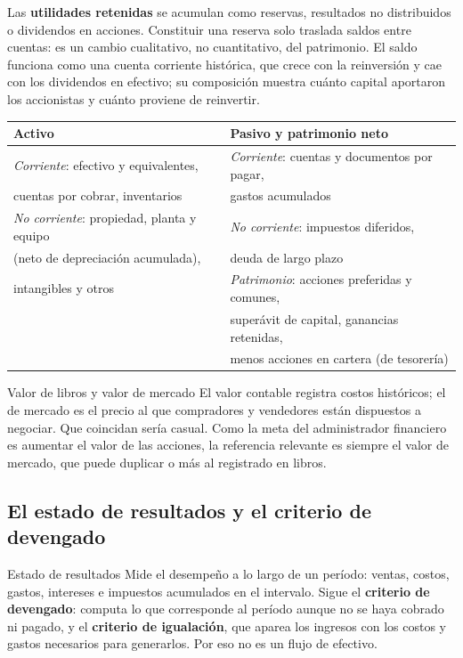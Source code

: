 Las \textbf{utilidades retenidas} se acumulan como reservas, resultados no distribuidos o dividendos en acciones. Constituir una reserva solo traslada saldos entre cuentas: es un cambio cualitativo, no cuantitativo, del patrimonio. El saldo funciona como una cuenta corriente histórica, que crece con la reinversión y cae con los dividendos en efectivo; su composición muestra cuánto capital aportaron los accionistas y cuánto proviene de reinvertir.

\begin{center}
\small
\begin{tabular}{@{}ll@{}}
\toprule
\textbf{Activo} & \textbf{Pasivo y patrimonio neto}\\
\midrule
\emph{Corriente}: efectivo y equivalentes, & \emph{Corriente}: cuentas y documentos por pagar,\\
cuentas por cobrar, inventarios & gastos acumulados\\
\emph{No corriente}: propiedad, planta y equipo & \emph{No corriente}: impuestos diferidos,\\
(neto de depreciación acumulada), & deuda de largo plazo\\
intangibles y otros & \emph{Patrimonio}: acciones preferidas y comunes,\\
 & superávit de capital, ganancias retenidas,\\
 & menos acciones en cartera (de tesorería)\\
\bottomrule
\end{tabular}
\end{center}

\begin{definicion}{Valor de libros y valor de mercado}
El valor contable registra costos históricos; el de mercado es el precio al que compradores y vendedores están dispuestos a negociar. Que coincidan sería casual. Como la meta del administrador financiero es aumentar el valor de las acciones, la referencia relevante es siempre el valor de mercado, que puede duplicar o más al registrado en libros.
\end{definicion}

\subsection{El estado de resultados y el criterio de devengado}

\begin{definicion}{Estado de resultados}
Mide el desempeño a lo largo de un período: ventas, costos, gastos, intereses e impuestos acumulados en el intervalo. Sigue el \textbf{criterio de devengado}: computa lo que corresponde al período aunque no se haya cobrado ni pagado, y el \textbf{criterio de igualación}, que aparea los ingresos con los costos y gastos necesarios para generarlos. Por eso no es un flujo de efectivo.
\end{definicion}

